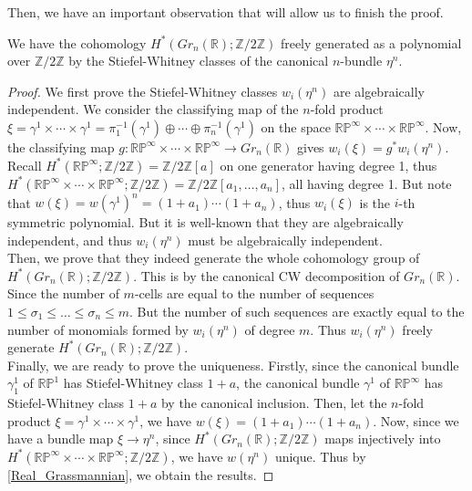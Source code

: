 	Then, we have an important observation that will allow us to finish the proof. 
	\begin{thm}\label{SW_gen}
		We have the cohomology $H^*(Gr_n(\mathbb{R});\mathbb{Z}/2\mathbb{Z})$ freely generated as a polynomial over $\mathbb{Z}/2\mathbb{Z}$ by the Stiefel-Whitney classes of the canonical $n$-bundle $\eta^n$. 
	\end{thm}
	\begin{proof}
		We first prove the Stiefel-Whitney classes $w_i(\eta^n)$ are algebraically independent. We consider the classifying map of the $n$-fold product $\xi=\gamma^1\times\cdots\times\gamma^1=\pi_1^{-1}(\gamma^1)\oplus\cdots\oplus\pi_n^{-1}(\gamma^1)$ on the space $\mathbb{RP}^\infty\times\cdots\times\mathbb{RP}^\infty$. Now, the classifying map $g:\mathbb{RP}^\infty\times\cdots\times\mathbb{RP}^\infty\to Gr_n(\mathbb{R})$ gives $w_i(\xi)=g^*w_i(\eta^n)$. Recall $H^*(\mathbb{RP}^\infty;\mathbb{Z}/2\mathbb{Z})=\mathbb{Z}/2\mathbb{Z}[a]$ on one generator having degree 1, thus $H^*(\mathbb{RP}^\infty\times\cdots\times\mathbb{RP}^\infty;\mathbb{Z}/2\mathbb{Z})=\mathbb{Z}/2\mathbb{Z}[a_1,\dots,a_n]$, all having degree 1. But note that $w(\xi)=w(\gamma^1)^n=(1+a_1)\cdots(1+a_n)$, thus $w_i(\xi)$ is the $i$-th symmetric polynomial. But it is well-known that they are algebraically independent, and thus $w_i(\eta^n)$ must be algebraically independent. \\
		Then, we prove that they indeed generate the whole cohomology group of $H^*(Gr_n(\mathbb{R});\mathbb{Z}/2\mathbb{Z})$. This is by the canonical CW decomposition of $Gr_n(\mathbb{R})$. Since the number of $m$-cells are equal to the number of sequences $1\le\sigma_1\le\dots\le\sigma_n\le m$. But the number of such sequences are exactly equal to the number of monomials formed by $w_i(\eta^n)$ of degree $m$. Thus $w_i(\eta^n)$ freely generate $H^*(Gr_n(\mathbb{R});\mathbb{Z}/2\mathbb{Z})$. \\
		Finally, we are ready to prove the uniqueness. Firstly, since the canonical bundle $\gamma_1^1$ of $\mathbb{RP}^1$ has Stiefel-Whitney class $1+a$, the canonical bundle $\gamma^1$ of $\mathbb{RP}^\infty$ has Stiefel-Whitney class $1+a$ by the canonical inclusion. Then, let the $n$-fold product $\xi=\gamma^1\times\cdots\times\gamma^1$, we have $w(\xi)=(1+a_1)\cdots(1+a_n)$. Now, since we have a bundle map $\xi\to\eta^n$, since $H^*(Gr_n(\mathbb{R});\mathbb{Z}/2\mathbb{Z})$ maps injectively into $H^*(\mathbb{RP}^\infty\times\cdots\times\mathbb{RP}^\infty;\mathbb{Z}/2\mathbb{Z})$, we have $w(\eta^n)$ unique. Thus by \cref{Real_Grassmannian}, we obtain the results. 
	\end{proof}

